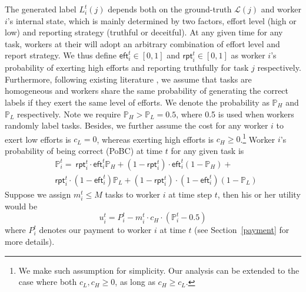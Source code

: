 The generated label $L^{t}_{i}(j)$ depends both on the ground-truth $\mathcal{L}(j)$ and worker $i$'s internal state, which is mainly determined by two factors, effort level (high or low) and reporting strategy (truthful or deceitful).
At any given time for any task, workers at their will adopt an arbitrary combination of effort level and report strategy. We thus define $\textsf{eft}^{t}_i\in[0,1]$ and $\textsf{rpt}^{t}_i\in[0,1]$ as worker $i$'s probability of exerting high efforts and reporting truthfully for task $j$ %
respectively. Furthermore, following existing literature \citet{dasgupta2013crowdsourced,liu2017sequential}, we assume that tasks are homogeneous and workers share the same probability of generating the correct labels if they exert the same level of efforts. We denote the probability as $\mathbb{P}_{H}$ and $\mathbb{P}_{L}$ respectively. Note we require $\mathbb{P}_{H} > \mathbb{P}_{L} = 0.5$, where 0.5 is used when workers randomly label tasks.
Besides, we further assume the cost for any worker $i$ to exert low efforts is $c_{L} = 0$, whereas exerting high efforts is $c_{H} \geq 0$.\footnote{We make such assumption for simplicity. Our analysis can be extended to the case where both $c_{L},  c_{H} \geq 0$, as long as $c_{H} \geq c_{L}$.}
Worker $i$'s probability of being correct (PoBC) at time $t$ for any given task is
\begin{equation}
\begin{split}
&\mathbb{P}^{t}_i  = ~\textsf{rpt}^{t}_i \cdot\textsf{eft}^{t}_i \mathbb{P}_{H}+ (1-\textsf{rpt}^{t}_i)\cdot \textsf{eft}^{t}_i (1-\mathbb{P}_{ H})+\\
&\textsf{rpt}^{t}_i \cdot(1-\textsf{eft}^{t}_i) \mathbb{P}_{L}+(1-\textsf{rpt}^{t}_i) \cdot(1-\textsf{eft}^{t}_i) (1-\mathbb{P}_{L})
\end{split}
\end{equation}
Suppose we assign $m^{t}_i\leq M$ tasks to worker $i$ at time step $t$, then his or her utility would be 
\begin{equation}
\label{equation:u_of_worker}
u_i^t=P_i^t - m^{t}_i \cdot c_H\cdot (\mathbb{P}_i^t-0.5)
\end{equation}
where $P^{t}_{i}$ denotes our payment to worker $i$ at time $t$ (see Section~\ref{payment} for more details).

